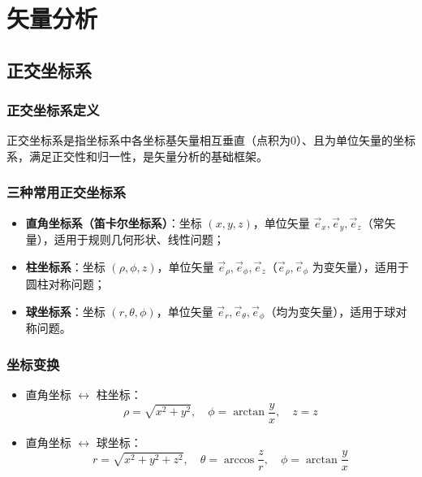 

\section{矢量分析}

\subsection{正交坐标系}
\subsubsection{正交坐标系定义}
正交坐标系是指坐标系中各坐标基矢量相互垂直（点积为0）、且为单位矢量的坐标系，满足正交性和归一性，是矢量分析的基础框架。

\subsubsection{三种常用正交坐标系}
\begin{itemize}
    \item \textbf{直角坐标系（笛卡尔坐标系）}：坐标 $(x, y, z)$，单位矢量 $\vec{e}_x, \vec{e}_y, \vec{e}_z$（常矢量），适用于规则几何形状、线性问题；
    \item \textbf{柱坐标系}：坐标 $(\rho, \phi, z)$，单位矢量 $\vec{e}_\rho, \vec{e}_\phi, \vec{e}_z$（$\vec{e}_\rho, \vec{e}_\phi$ 为变矢量），适用于圆柱对称问题；
    \item \textbf{球坐标系}：坐标 $(r, \theta, \phi)$，单位矢量 $\vec{e}_r, \vec{e}_\theta, \vec{e}_\phi$（均为变矢量），适用于球对称问题。
\end{itemize}

\subsubsection{坐标变换}
\begin{itemize}
  \item 直角坐标 $\leftrightarrow$ 柱坐标：
  \[
  \rho = \sqrt{x^2+y^2},\quad \phi = \arctan\frac{y}{x},\quad z=z
  \]
  \item 直角坐标 $\leftrightarrow$ 球坐标：
  \[
  r = \sqrt{x^2+y^2+z^2},\quad \theta = \arccos\frac{z}{r},\quad \phi = \arctan\frac{y}{x}
  \]
\end{itemize}

